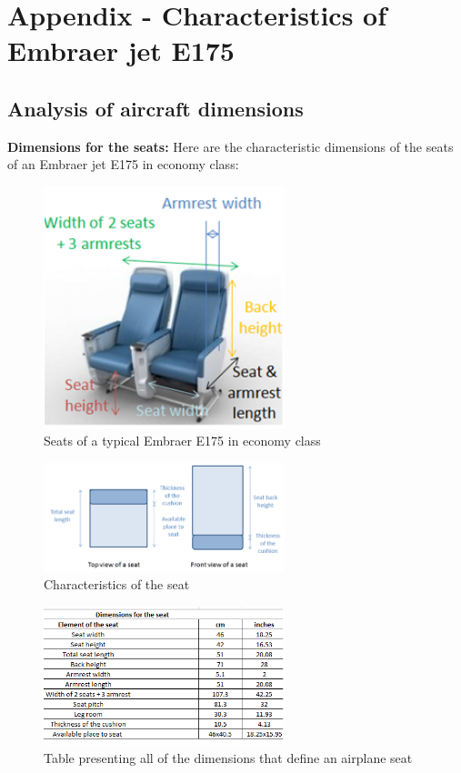 \chapter{Appendix - Characteristics of Embraer jet E175}

\section{Analysis of aircraft dimensions}
\textbf{Dimensions for the seats:}
Here are the characteristic dimensions of the seats of an Embraer jet E175 in economy class:
\begin{figure}[h]
\centering
\includegraphics[width=7cm]{images/seat_dimensions_image_global.png}
\caption{Seats of a typical Embraer E175 in economy class}
\label{fig:seat_dimensions_1}
\end{figure}

\begin{figure}[h]
\centering
\includegraphics[width=7cm]{images/seat_dimensions_image_topandfront_view.png}
\caption{Characteristics of the seat}
\label{fig: seat_dimensions_2}
\end{figure}

\begin{figure}[h]
\centering
\includegraphics[width=7cm]{images/seat_dimensions_table}
\caption{Table presenting all of the dimensions that define an airplane seat}
\label{fig: seat_dimensions_table}
\end{figure}

